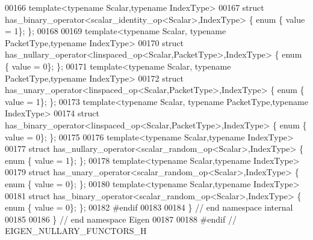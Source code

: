 \begin{DoxyCode}
00166 \textcolor{keyword}{template}<\textcolor{keyword}{typename} Scalar,\textcolor{keyword}{typename} IndexType>
00167 \textcolor{keyword}{struct }has\_binary\_operator<scalar\_identity\_op<Scalar>,IndexType> \{ \textcolor{keyword}{enum} \{ value = 1\}; \};
00168 
00169 \textcolor{keyword}{template}<\textcolor{keyword}{typename} Scalar, \textcolor{keyword}{typename} PacketType,\textcolor{keyword}{typename} IndexType>
00170 \textcolor{keyword}{struct }has\_nullary\_operator<linspaced\_op<Scalar,PacketType>,IndexType> \{ \textcolor{keyword}{enum} \{ value = 0\}; \};
00171 \textcolor{keyword}{template}<\textcolor{keyword}{typename} Scalar, \textcolor{keyword}{typename} PacketType,\textcolor{keyword}{typename} IndexType>
00172 \textcolor{keyword}{struct }has\_unary\_operator<linspaced\_op<Scalar,PacketType>,IndexType> \{ \textcolor{keyword}{enum} \{ value = 1\}; \};
00173 \textcolor{keyword}{template}<\textcolor{keyword}{typename} Scalar, \textcolor{keyword}{typename} PacketType,\textcolor{keyword}{typename} IndexType>
00174 \textcolor{keyword}{struct }has\_binary\_operator<linspaced\_op<Scalar,PacketType>,IndexType> \{ \textcolor{keyword}{enum} \{ value = 0\}; \};
00175 
00176 \textcolor{keyword}{template}<\textcolor{keyword}{typename} Scalar,\textcolor{keyword}{typename} IndexType>
00177 \textcolor{keyword}{struct }has\_nullary\_operator<scalar\_random\_op<Scalar>,IndexType> \{ \textcolor{keyword}{enum} \{ value = 1\}; \};
00178 \textcolor{keyword}{template}<\textcolor{keyword}{typename} Scalar,\textcolor{keyword}{typename} IndexType>
00179 \textcolor{keyword}{struct }has\_unary\_operator<scalar\_random\_op<Scalar>,IndexType> \{ \textcolor{keyword}{enum} \{ value = 0\}; \};
00180 \textcolor{keyword}{template}<\textcolor{keyword}{typename} Scalar,\textcolor{keyword}{typename} IndexType>
00181 \textcolor{keyword}{struct }has\_binary\_operator<scalar\_random\_op<Scalar>,IndexType> \{ \textcolor{keyword}{enum} \{ value = 0\}; \};
00182 \textcolor{preprocessor}{#endif}
00183 
00184 \} \textcolor{comment}{// end namespace internal}
00185 
00186 \} \textcolor{comment}{// end namespace Eigen}
00187 
00188 \textcolor{preprocessor}{#endif // EIGEN\_NULLARY\_FUNCTORS\_H}
\end{DoxyCode}
